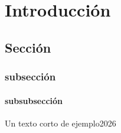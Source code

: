 \chapter{Introducción}
\section{Sección}
\subsection{subsección}
\subsubsection{subsubsección}
Un texto corto de ejemplo2026